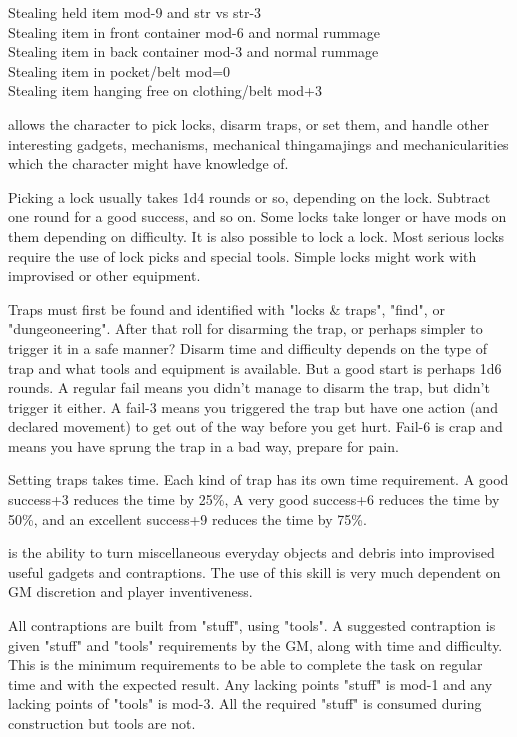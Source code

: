 Stealing held item mod-9 and str vs str-3 \\
Stealing item in front container mod-6 and normal rummage \\
Stealing item in back container mod-3 and normal rummage \\
Stealing item in pocket/belt mod=0 \\
Stealing item hanging free on clothing/belt mod+3


 allows the character to pick locks, disarm traps, or set them, and handle other interesting gadgets, mechanisms, mechanical thingamajings and mechanicularities which the character might have knowledge of.

Picking a lock usually takes 1d4 rounds or so, depending on the lock. Subtract one round for a good success, and so on. Some locks take longer or have mods on them depending on difficulty. It is also possible to lock a lock.
Most serious locks require the use of lock picks and special tools. Simple locks might work with improvised or other equipment.

Traps must first be found and identified with "locks \& traps", "find", or "dungeoneering". After that roll for disarming the trap, or perhaps simpler to trigger it in a safe manner? Disarm time and difficulty depends on the type of trap and what tools and equipment is available. But a good start is perhaps 1d6 rounds.
A regular fail means you didn't manage to disarm the trap, but didn't trigger it either. A fail-3 means you triggered the trap but have one action (and declared movement) to get out of the way before you get hurt. Fail-6 is crap and means you have sprung the trap in a bad way, prepare for pain.

Setting traps takes time. Each kind of trap has its own time requirement. A good success+3 reduces the time by 25\%, A very good success+6 reduces the time by 50\%, and an excellent success+9 reduces the time by 75\%.


 is the ability to turn miscellaneous everyday objects and debris into improvised useful gadgets and contraptions. The use of this skill is very much dependent on GM discretion and player inventiveness.

All contraptions are built from "stuff", using "tools". A suggested contraption is given "stuff" and "tools" requirements by the GM, along with time and difficulty. This is the minimum requirements to be able to complete the task on regular time and with the expected result. Any lacking points "stuff" is mod-1 and any lacking points of "tools" is mod-3.
All the required "stuff" is consumed during construction but tools are not.

